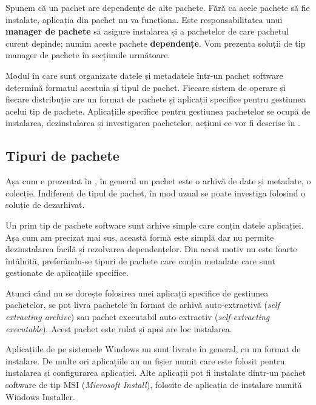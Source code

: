 Spunem că un pachet are dependențe de alte pachete. Fără ca acele pachete să fie instalate, aplicația din pachet nu va funcționa. Este responsabilitatea unui \textbf{manager de pachete} să asigure instalarea și a pachetelor de care pachetul curent depinde; numim aceste pachete \textbf{dependențe}. Vom prezenta soluții de tip manager de pachete în secțiunile următoare.

Modul în care sunt organizate datele și metadatele într-un pachet software determină formatul acestuia și tipul de pachet. Fiecare sistem de operare și fiecare distribuție are un format de pachete și aplicații specifice pentru gestiunea acelui tip de pachete. Aplicațiile specifice pentru gestiunea pachetelor se ocupă de instalarea, dezinstalarea și investigarea pachetelor, acțiuni ce vor fi descrise în .

\subsection{Tipuri de pachete}
\label{sec:package:types}

Așa cum e prezentat în , în general un pachet este o arhivă de date și metadate, o colecție. Indiferent de tipul de pachet, în mod uzual se poate investiga folosind o soluție de dezarhivat.

Un prim tip de pachete software sunt arhive simple care conțin datele aplicației. Așa cum am precizat mai sus, această formă este simplă dar nu permite dezinstalarea facilă și rezolvarea dependențelor. Din acest motiv nu este foarte întâlnită, preferându-se tipuri de pachete care conțin metadate care sunt gestionate de aplicațiile specifice.

Atunci când nu se dorește folosirea unei aplicații specifice de gestiunea pachetelor, se pot livra pachetele în format de arhivă auto-extractivă (\textit{self extracting archive}) sau pachet executabil auto-extractiv (\textit{self-extracting executable}). Acest pachet este rulat și apoi are loc instalarea.

Aplicațiile de pe sistemele Windows nu sunt livrate în general, cu un format de instalare. De multe ori aplicațiile au un fișier numit  care este folosit pentru instalarea și configurarea aplicației. Alte aplicații pot fi instalate dintr-un pachet software de tip MSI  (\textit{Microsoft Install}), folosite de aplicația de instalare numită Windows Installer.

